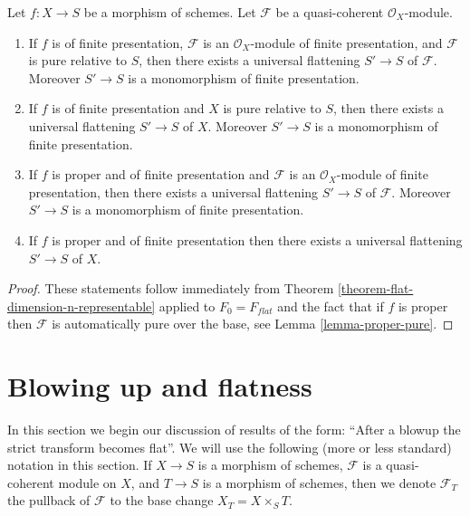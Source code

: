 \begin{lemma}
\label{lemma-when-universal-flattening}
Let $f : X \to S$ be a morphism of schemes.
Let $\mathcal{F}$ be a quasi-coherent $\mathcal{O}_X$-module.
\begin{enumerate}
\item If $f$ is of finite presentation, $\mathcal{F}$ is an
$\mathcal{O}_X$-module of finite presentation, and $\mathcal{F}$ is
pure relative to $S$, then there exists a universal flattening
$S' \to S$ of $\mathcal{F}$. Moreover $S' \to S$ is a monomorphism
of finite presentation.
\item If $f$ is of finite presentation and $X$ is pure relative to $S$,
then there exists a universal flattening $S' \to S$ of $X$.
Moreover $S' \to S$ is a monomorphism of finite presentation.
\item If $f$ is proper and of finite presentation and $\mathcal{F}$ is an
$\mathcal{O}_X$-module of finite presentation, then there exists a
universal flattening $S' \to S$ of $\mathcal{F}$. Moreover $S' \to S$ is
a monomorphism of finite presentation.
\item If $f$ is proper and of finite presentation
then there exists a universal flattening $S' \to S$ of $X$.
\end{enumerate}
\end{lemma}

\begin{proof}
These statements follow immediately from
Theorem \ref{theorem-flat-dimension-n-representable}
applied to $F_0 = F_{flat}$
and the fact that if $f$ is proper then $\mathcal{F}$ is automatically
pure over the base, see
Lemma \ref{lemma-proper-pure}.
\end{proof}







\section{Blowing up and flatness}
\label{section-blowup-flat}

\noindent
In this section we begin our discussion of results of the form: ``After a
blowup the strict transform becomes flat''. We will use the following
(more or less standard) notation in this section. If $X \to S$ is
a morphism of schemes, $\mathcal{F}$ is a quasi-coherent module
on $X$, and $T \to S$ is a morphism of schemes, then we denote
$\mathcal{F}_T$ the pullback of $\mathcal{F}$ to the base change
$X_T = X \times_S T$.

